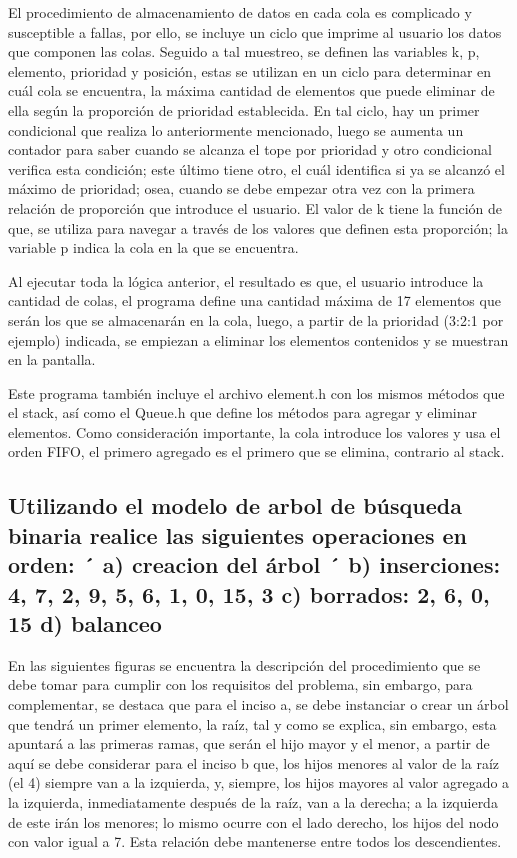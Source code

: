 \documentclass[11pt]{article}
\begin{document}
El procedimiento de almacenamiento de datos en cada cola es complicado y susceptible a fallas, por ello, se incluye un ciclo que imprime al usuario los datos que componen las colas. Seguido a tal muestreo, se definen las variables k, p, elemento, prioridad y posición, estas se utilizan en un ciclo para determinar en cuál cola se encuentra, la máxima cantidad de elementos que puede eliminar de ella según la proporción de prioridad establecida. En tal ciclo, hay un primer condicional que realiza lo anteriormente mencionado, luego se aumenta un contador para saber cuando se alcanza el tope por prioridad y otro condicional verifica esta condición; este último tiene otro, el cuál identifica si ya se alcanzó el máximo de prioridad; osea, cuando se debe empezar otra vez con la primera relación de proporción que introduce el usuario. El valor de k tiene la función de que, se utiliza para navegar a través de los valores que definen esta proporción; la variable p indica la cola en la que se encuentra.

Al ejecutar toda la lógica anterior, el resultado es que, el usuario introduce la cantidad de colas, el programa define una cantidad máxima de 17 elementos que serán los que se almacenarán en la cola, luego, a partir de la prioridad (3:2:1 por ejemplo) indicada, se empiezan a eliminar los elementos contenidos y se muestran en la pantalla. 

Este programa también incluye el archivo element.h con los mismos métodos que el stack, así como el Queue.h que define los métodos para agregar y eliminar elementos. Como consideración importante, la cola introduce los valores y usa el orden FIFO, el primero agregado es el primero que se elimina, contrario al stack. 


\newpage
\subsection{Utilizando el modelo de arbol de búsqueda binaria realice las siguientes operaciones en orden: ´
a) creacion del árbol ´
b) inserciones: 4, 7, 2, 9, 5, 6, 1, 0, 15, 3
c) borrados: 2, 6, 0, 15
d) balanceo}

En las siguientes figuras se encuentra la descripción del procedimiento que se debe tomar para cumplir con los requisitos del problema, sin embargo, para complementar, se destaca que para el inciso a, se debe instanciar o crear un árbol que tendrá un primer elemento, la raíz, tal y como se explica, sin embargo, esta apuntará a las primeras ramas, que serán el hijo mayor y el menor, a partir de aquí se debe considerar para el inciso b que, los hijos menores al valor de la raíz (el 4) siempre van a la izquierda, y, siempre, los hijos mayores al valor agregado a la izquierda, inmediatamente después de la raíz, van a la derecha; a la izquierda de este irán los menores; lo mismo ocurre con el lado derecho, los hijos del nodo con valor igual a 7. Esta relación debe mantenerse entre todos los descendientes.
\end{document}
